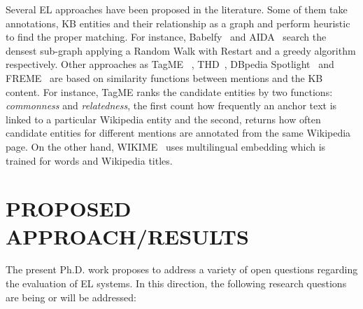 \documentclass[sigconf]{acmart}
\begin{document}
Several EL approaches have been proposed in the literature. Some of them take annotations, KB entities and their relationship as a graph and perform heuristic to find the proper matching. For instance, Babelfy~\cite{0001RN14} and AIDA~\cite{HoffartYBFPSTTW11} search the densest sub-graph applying a Random Walk with Restart and a greedy algorithm respectively. Other approaches as TagME~\cite{FerraginaS10} , THD~\cite{DojchinovskiK13}, DBpedia Spotlight~\cite{MendesJGB11} and FREME~\cite{SasakiDN16} are based on similarity functions between mentions and the KB content. For instance, TagME ranks the candidate entities by two functions: \textit{commonness} and \textit{relatedness}, the first count how frequently an anchor text is linked to a particular Wikipedia entity and the second, returns how often candidate entities for different mentions are annotated from the same Wikipedia page. On the other hand, WIKIME~\cite{TsaiR16} uses multilingual embedding which is trained for words and Wikipedia titles. 

\section{PROPOSED APPROACH/RESULTS}

The present Ph.D. work proposes to address a variety of open questions regarding the evaluation of EL systems. In this direction, the following research questions are being or will be addressed:
\end{document}
